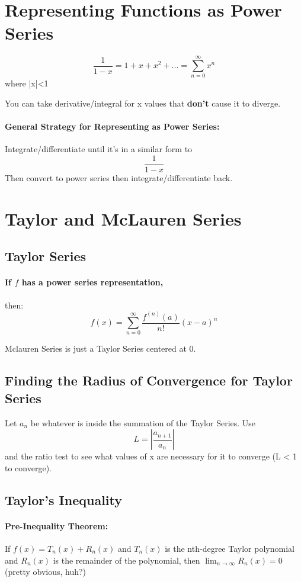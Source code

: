 \documentclass[a4paper,12pt]{report}
\begin{document}
\section{Representing Functions as Power Series}
$$\frac{1}{1-x} = 1 + x + x^2 + ... = \sum_{n=0}^{\infty}x^n$$ where |x|<1

You can take derivative/integral for x values that \textbf{don't} cause it to diverge.

\paragraph{General Strategy for Representing as Power Series: }
Integrate/differentiate until it's in a similar form to $$\frac{1}{1-x}$$
Then convert to power series then integrate/differentiate back.

\section{Taylor and McLauren Series}
\subsection{Taylor Series}
\paragraph{If $f$ has a power series representation, } then:
$$f(x) = \sum_{n=0}^{\infty} \frac{f^{(n)} (a)}{n!} (x-a)^n$$

Mclauren Series is just a Taylor Series centered at 0.

\subsection{Finding the Radius of Convergence for Taylor Series}
Let $a_n$ be whatever is inside the summation of the Taylor Series. Use $$L = |\frac{a_{n+1}}{a_n}|$$ and the ratio test to see what values of x are necessary for it to converge (L < 1 to converge).

\subsection{Taylor's Inequality}
\paragraph{Pre-Inequality Theorem: } If $f(x) = T_n(x) + R_n(x)$ and $T_n(x)$ is the nth-degree Taylor polynomial and $R_n(x)$ is the remainder of the polynomial, then $\lim_{n \to \infty} R_n(x) = 0$ (pretty obvious, huh?)
\end{document}
